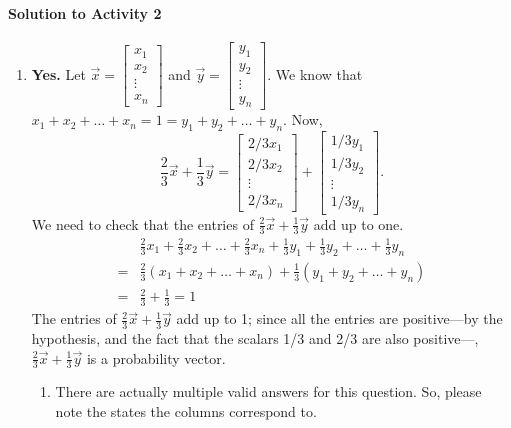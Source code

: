 \paragraph{Solution to Activity 2}
\begin{enumerate}
	\item \textbf{Yes.} Let \(\vec{x} = \begin{bmatrix}x_1 \\ x_2 \\ \vdots \\ x_n\end{bmatrix}\) and
		\(\vec{y} = \begin{bmatrix}y_1 \\ y_2 \\ \vdots \\ y_n\end{bmatrix}.\) We know that \(x_1 + x_2 + \dots + x_n = 1 = y_1 + y_2 + \dots + y_n.\) Now,
		\[
			\frac{2}{3}\vec{x} + \frac{1}{3}\vec{y}
			= \begin{bmatrix}2/3 x_1 \\ 2/3 x_2 \\ \vdots \\ 2/3 x_n\end{bmatrix} +
			   \begin{bmatrix}1/3y_1 \\ 1/3y_2 \\ \vdots \\ 1/3 y_n\end{bmatrix}.
		\]
		We need to check that the entries of \(\frac{2}{3}\vec{x} + \frac{1}{3}\vec{y}\) add up to one.
		\begin{align*}
			& \frac{2}{3}x_1 + \frac{2}{3} x_2 + \dots + \frac{2}{3}x_n + \frac{1}{3}y_1 + \frac{1}{3}y_2 + \dots + \frac{1}{3}y_n \\[0.5em]
	             = &\frac{2}{3}(x_1 + x_2 + \dots + x_n) + \frac{1}{3}(y_1 + y_2 + \dots + y_n) \\[0.5em]
		     = &\frac{2}{3} + \frac{1}{3} = 1
		\end{align*}
		The entries of \(\frac{2}{3}\vec{x} + \frac{1}{3}\vec{y}\) add up to 1; since all the entries are positive---by the hypothesis, and the fact that the
		scalars 1/3 and 2/3 are also positive---, \(\frac{2}{3}\vec{x} + \frac{1}{3}\vec{y}\) is a probability vector.
	\begin{enumerate}
		\item There are actually multiple valid answers for this question. So, please note the states the columns correspond to.
			\NiceMatrixOptions{
}
\end{enumerate}
\end{enumerate}
